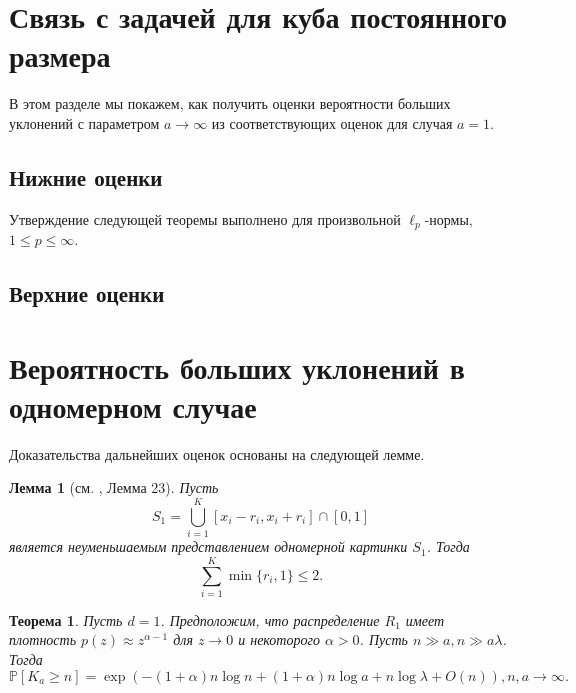 \documentclass[12pt]{article}
\theoremstyle{plain}
\newtheorem{thm}{Теорема} %
\newtheorem{lm}{Лемма}
\theoremstyle{definition}
\theoremstyle{remark}
\def\geq{\geqslant}
\def\leq{\leqslant}
\newcommand{\PP}{\mathbb{P}}
\begin{document}
\section{Связь с задачей для куба постоянного размера}

В этом разделе мы покажем, как получить оценки вероятности больших уклонений с параметром $a\to \infty$ из соответствующих оценок для случая  $a=1$. 

\subsection{Нижние оценки}
Утверждение следующей теоремы выполнено для произвольной $\ell_p$-нормы, $1 \leq p \leq \infty$.


\subsection{Верхние оценки}


\section{Вероятность больших уклонений в одномерном случае}

Доказательства дальнейших оценок основаны на следующей лемме.

\begin{lm}[см. \cite{AL}, Лемма 23]\label{1dimlemma}
 Пусть $$S_1 = \bigcup_{i=1}^K [x_i-r_i, x_i+r_i] \cap [0,1]$$ является неуменьшаемым представлением одномерной картинки $S_1$. Тогда $$\sum_{i=1}^K \min \{r_i, 1\} \leq 2.$$
\end{lm}

\begin{thm}
Пусть $d=1$. Предположим, что распределение $R_1$ имеет плотность $p(z)\approx z^{\alpha-1}$ для $z\to 0$ и некоторого $\alpha > 0$. Пусть $n\gg a, n\gg a\lambda$. Тогда 
\begin{equation*}
    \PP[K_a\geq n] = \exp(-(1+\alpha)n\log n + (1+\alpha)n\log a + n\log\lambda +O(n)), n,a \to\infty.
\end{equation*}
\end{thm}
\end{document}

